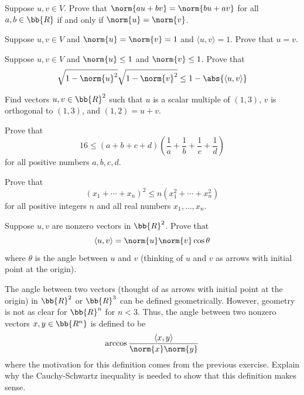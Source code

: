 \documentclass[12pt,letterpaper]{hmcpset}
\begin{document}
\pagebreak

\begin{problem}[7]
	Suppose $u, v \in V$. Prove that $\norm{au + bv} = \norm{bu + av}$ for all $a, b \in \bb{R}$ if and only if $\norm{u} = \norm{v}$.
\end{problem}

\pagebreak

\begin{problem}[8]
	Suppose $u, v \in V$ and $\norm{u} = \norm{v} = 1$ and $\langle u, v \rangle = 1$. Prove that $u = v$.
\end{problem}

\pagebreak

\begin{problem}[9]
	Suppose $u, v \in V$ and $\norm{u} \le 1$ and $\norm{v} \le 1$. Prove that
	\[
		\sqrt{1 - \norm{u}^2} \sqrt{1 - \norm{v}^2} \le 1 - \abs{\langle u, v \rangle}
	\]
\end{problem}

\pagebreak

\begin{problem}[10]
	Find vectors $u, v \in \bb{R}^2$ such that $u$ is a scalar multiple of $(1, 3)$, $v$ is orthogonal to $(1, 3)$, and $(1, 2) = u + v.$
\end{problem}

\pagebreak

\begin{problem}[11]
	Prove that
	\[
		16 \le (a + b + c + d)(\frac{1}{a} + \frac{1}{b} + \frac{1}{c} + \frac{1}{d})
	\]
	for all positive numbers $a, b, c, d$.
\end{problem}

\pagebreak

\begin{problem}[12]
	Prove that
	\[
		(x_1 + \cdots + x_n)^2 \le n (x_1^2 + \cdots + x_n^2)
	\]
	for all positive integers $n$ and all real numbers $x_1, \ldots, x_n$.
\end{problem}

\pagebreak

\begin{problem}[13]
	Suppose $u, v$ are nonzero vectors in $\bb{R}^2$. Prove that
	\[
		\langle u, v \rangle = \norm{u} \norm{v} \cos{\theta}
	\]
	where $\theta$ is the angle between $u$ and $v$ (thinking of $u$ and $v$ as arrows with initial point at the origin).
\end{problem}

\pagebreak

\begin{problem}[14]
	The angle between two vectors (thought of as arrows with initial point at the origin) in $\bb{R}^2$ or $\bb{R}^3$ can be defined geometrically. However, geometry is not as clear for $\bb{R}^n$ for $n < 3$. Thus, the angle between two nonzero vectors $x, y \in \bb{R^n}$ is defined to be
	\[
		\arccos{\frac{\langle x, y \rangle}{\norm{x} \norm{y}}}
	\]
	where the motivation for this definition comes from the previous exercise. Explain why the Cauchy-Schwartz inequality is needed to show that this definition makes sense.
\end{problem}
\end{document}
